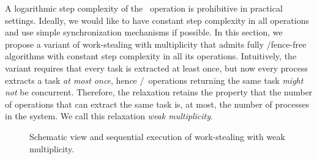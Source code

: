 A logarithmic step complexity of the \Take{}~operation is prohibitive in practical settings. Ideally, we would like to have constant step complexity in all operations and use simple synchronization mechanisms if possible. In this section, we propose a variant of work-stealing with multiplicity that admits fully \R/\W fence-free algorithms with constant step complexity in all its operations. Intuitively, the variant requires that every task is extracted at least once, but now every process extracts a task \emph{at most once}, hence \Take/\Steal~operations returning the same task \emph{might not} be concurrent. Therefore, the relaxation retains the property that the number of operations that can extract the same task is, at most, the number of processes in the system. We call this relaxation \emph{weak multiplicity}.

\begin{figure}[H]
  \centering
  \hfill
  \caption{\label{fig-weak-mult} Schematic view and sequential
    execution of work-stealing with weak multiplicity.}
\end{figure}



